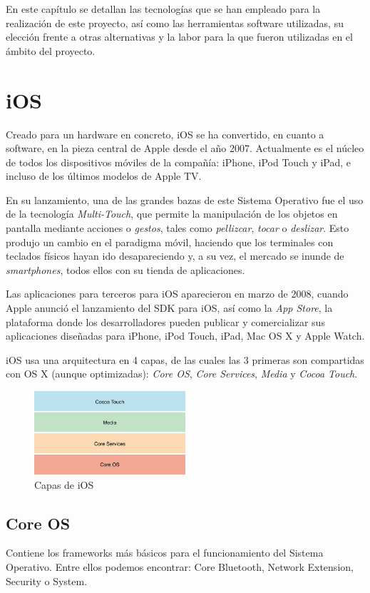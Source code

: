 En este capítulo se detallan las tecnologías que se han empleado para la realización de este proyecto, así como las herramientas software utilizadas, su elección frente a otras alternativas y la labor para la que fueron utilizadas en el ámbito del proyecto.

\section{iOS}
Creado para un hardware en concreto, iOS se ha convertido, en cuanto a software, en la pieza central de Apple desde el año 2007. Actualmente es el núcleo de todos los dispositivos móviles de la compañía: iPhone, iPod Touch y iPad, e incluso de los últimos modelos de Apple TV.

En su lanzamiento, una de las grandes bazas de este Sistema Operativo fue el uso de la tecnología \emph{Multi-Touch}, que permite la manipulación de los objetos en pantalla mediante acciones o \emph{gestos}, tales como \emph{pellizcar}, \emph{tocar} o \emph{deslizar}. Esto produjo un cambio en el paradigma móvil, haciendo que los terminales con teclados físicos hayan ido desapareciendo y, a su vez, el mercado se inunde de \emph{smartphones}, todos ellos con su tienda de aplicaciones.

Las aplicaciones para terceros para iOS aparecieron en marzo de 2008, cuando Apple anunció el lanzamiento del SDK para iOS, así como la \emph{App Store}, la plataforma donde los desarrolladores pueden publicar y comercializar sus aplicaciones diseñadas para iPhone, iPod Touch, iPad, Mac OS X y Apple Watch.

iOS usa una arquitectura en 4 capas, de las cuales las 3 primeras son compartidas con OS X (aunque optimizadas): \emph{Core OS}, \emph{Core Services}, \emph{Media} y \emph{Cocoa Touch}.


\begin{figure}[h]
	\centering
		\includegraphics[width=0.5\textwidth]{./img/ios-layers.png}
	\caption{Capas de iOS}
\end{figure}

\subsection*{Core OS}
Contiene los frameworks más básicos para el funcionamiento del Sistema Operativo. Entre ellos podemos encontrar: Core Bluetooth, Network Extension, Security o System.

